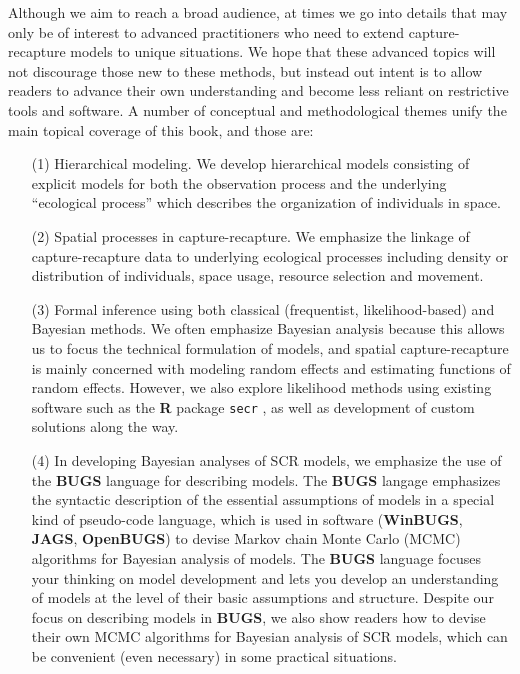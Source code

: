 Although we aim to reach a broad audience, at times we go into details
that may only be of interest to advanced practitioners who need to
extend capture-recapture models to unique situations.  We hope that
these advanced topics will not discourage those new to these methods,
but instead out intent is to allow readers to advance their own
understanding and become less reliant on restrictive tools and
software.
A number of conceptual and methodological
themes unify the main topical coverage of this book, and those are:

\begin{itemize}
\item[(1)] Hierarchical modeling. We develop hierarchical models
  consisting of explicit models for both the observation process and
  the underlying ``ecological process'' which describes the
  organization of individuals in space.

\item[(2)] Spatial processes in capture-recapture. We emphasize the
  linkage of capture-recapture data to underlying ecological processes
  including density or distribution of individuals, 
space usage, resource selection and movement.

\item[(3)] Formal inference using both classical (frequentist,
  likelihood-based) and Bayesian methods. We often emphasize
  Bayesian analysis because this allows us to focus the technical
  formulation of models, and spatial capture-recapture is mainly
  concerned with modeling random effects and estimating functions of
  random effects. However, we also explore likelihood methods using existing
  software such as the {\bf R} package \mbox{\tt secr} \citep{efford:2011}, as well as
  development of custom solutions along the way.

\item[(4)] In developing Bayesian analyses of SCR models, we emphasize
  the use of the {\bf BUGS} language for describing models. The {\bf BUGS}
langage emphasizes the syntactic description of the essential
  assumptions of models in a special kind of pseudo-code language,
  which is used in software ({\bf WinBUGS}, {\bf JAGS}, {\bf OpenBUGS}) to devise Markov
  chain Monte Carlo (MCMC) algorithms for Bayesian analysis of
  models. The {\bf BUGS} language focuses your thinking on model development
  and lets you develop an understanding of models at the level of
  their basic assumptions and structure.  Despite our focus on
  describing models in {\bf BUGS}, we also show readers how
  to devise their own MCMC algorithms for Bayesian analysis of SCR
  models, which can be convenient (even necessary) in some practical
  situations.

\end{itemize}
